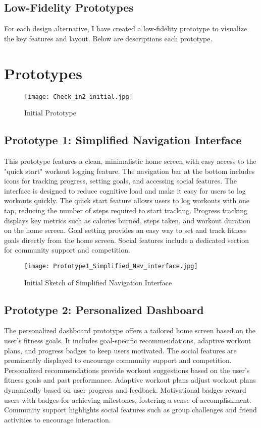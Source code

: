 \documentclass[
	letterpaper, %
]{jdf}
\begin{document}
\subsection {Low-Fidelity Prototypes}
For each design alternative, I have created a low-fidelity prototype to visualize the key features and layout. Below are descriptions each prototype.

\section{Prototypes}
\begin{figure}
    \centering
    \texttt{[image: Check\_in2\_initial.jpg]}
    \caption{Initial Prototype}
    \label{fig:enter-label}
\end{figure}

\subsection{Prototype 1: Simplified Navigation Interface}
This prototype features a clean, minimalistic home screen with easy access to the "quick start" workout logging feature. The navigation bar at the bottom includes icons for tracking progress, setting goals, and accessing social features. The interface is designed to reduce cognitive load and make it easy for users to log workouts quickly. The quick start feature allows users to log workouts with one tap, reducing the number of steps required to start tracking. Progress tracking displays key metrics such as calories burned, steps taken, and workout duration on the home screen. Goal setting provides an easy way to set and track fitness goals directly from the home screen. Social features include a dedicated section for community support and competition.

\begin{figure}
    \centering
    \texttt{[image: Prototype1\_Simplified\_Nav\_interface.jpg]}
    \caption{Initial Sketch of Simplified Navigation Interface}
    \label{fig:enter-label}
\end{figure}

\subsection {Prototype 2: Personalized Dashboard}
The personalized dashboard prototype offers a tailored home screen based on the user's fitness goals. It includes goal-specific recommendations, adaptive workout plans, and progress badges to keep users motivated. The social features are prominently displayed to encourage community support and competition. Personalized recommendations provide workout suggestions based on the user's fitness goals and past performance. Adaptive workout plans adjust workout plans dynamically based on user progress and feedback. Motivational badges reward users with badges for achieving milestones, fostering a sense of accomplishment. Community support highlights social features such as group challenges and friend activities to encourage interaction.
\end{document}
